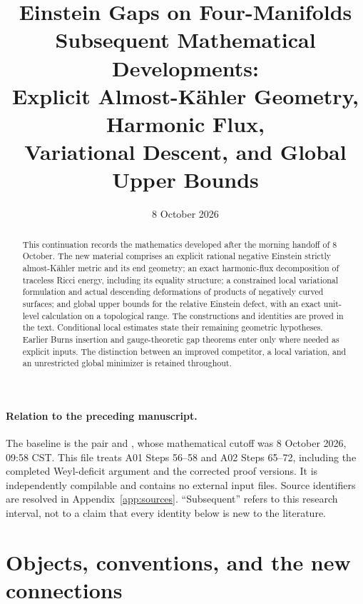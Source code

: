 \documentclass[11pt]{article}
\title{Einstein Gaps on Four-Manifolds\\[4pt]
\large Subsequent Mathematical Developments:\\
Explicit Almost-K\"ahler Geometry, Harmonic Flux,\\
Variational Descent, and Global Upper Bounds}
\author{}
\date{8 October 2026}
\theoremstyle{definition}
\theoremstyle{remark}
\begin{document}
\maketitle

\begin{abstract}
This continuation records the mathematics developed after the morning
handoff of 8 October. The new material comprises an explicit rational
negative Einstein strictly almost-K\"ahler metric and its end geometry;
an exact harmonic-flux decomposition of traceless Ricci energy, including
its equality structure; a constrained local variational formulation and
actual descending deformations of products of negatively curved surfaces;
and global upper bounds for the relative Einstein defect, with an exact
unit-level calculation on a topological range. The constructions and
identities are proved in the text. Conditional local estimates state their
remaining geometric hypotheses. Earlier Burns insertion and gauge-theoretic
gap theorems enter only where needed as explicit inputs. The distinction
between an improved competitor, a local variation, and an unrestricted
global minimizer is retained throughout.
\end{abstract}

\paragraph{Relation to the preceding manuscript.}
The baseline is the pair
 and
, whose mathematical cutoff was
8 October 2026, 09:58 CST. This file treats A01 Steps 56--58 and A02
Steps 65--72, including the completed Weyl-deficit argument and the
corrected proof versions.
It is independently compilable and contains no external input files.
Source identifiers are resolved in Appendix~\ref{app:sources}.
``Subsequent'' refers to this research interval, not to a claim that every
identity below is new to the literature.

\tableofcontents

\section{Objects, conventions, and the new connections}
\label{sec:conventions}
\end{document}

